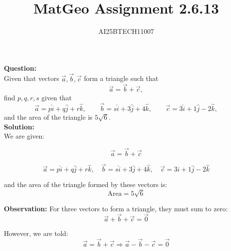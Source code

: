 \documentclass[journal]{IEEEtran}
\begin{document}

\vspace{3cm}

\title{MatGeo Assignment 2.6.13}
\author{AI25BTECH11007}
 \maketitle
{\let\newpage\relax\maketitle}

\renewcommand{\thefigure}{\theenumi}
\renewcommand{\thetable}{\theenumi}
\setlength{\intextsep}{10pt} %


\renewcommand{\thetable}{\theenumi}
\textbf{Question:}\\
Given that vectors $\vec{a},\vec{b},\vec{c}$ form a triangle such that
\[
\vec{a}=\vec{b}+\vec{c},
\]
find $p,q,r,s$ given that
\[
\vec{a}=p\hat{i}+q\hat{j}+r\hat{k},\qquad
\vec{b}=s\hat{i}+3\hat{j}+4\hat{k},\qquad
\vec{c}=3\hat{i}+1\hat{j}-2\hat{k},
\]
and the area of the triangle is $5\sqrt{6}$.\\


\noindent
\textbf{Solution:}\\
 We are given:

\begin{equation}
\vec{a} = \vec{b} + \vec{c}
\end{equation}

\begin{equation}
\vec{a} = p\hat{i} + q\hat{j} + r\hat{k}, \quad
\vec{b} = s\hat{i} + 3\hat{j} + 4\hat{k}, \quad
\vec{c} = 3\hat{i} + 1\hat{j} -2\hat{k}
\end{equation}

and the area of the triangle formed by these vectors is:
\begin{equation}
\text{Area} = 5\sqrt{6}
\end{equation}

\vspace{1em}
\noindent
\textbf{Observation:} For three vectors to form a triangle, they must sum to zero:
\begin{equation}
\vec{a} + \vec{b} + \vec{c} = \vec{0}
\end{equation}

However, we are told:
\begin{equation}
\vec{a} = \vec{b} + \vec{c} \Rightarrow \vec{a} - \vec{b} - \vec{c} = \vec{0}
\end{equation}
\end{document}
